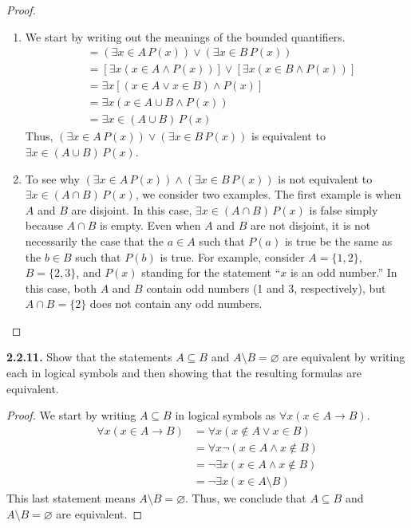 \documentclass[12pt]{amsart}
\newenvironment{statement}[1]{\smallskip\noindent\color[rgb]{.6627, .3529, .6314} {\bf #1.}}{}
\theoremstyle{definition}
\theoremstyle{remark}
\begin{document}
\begin{proof}
\hfill
\begin{enumerate}
	\item We start by writing out the meanings of the bounded quantifiers.
	\begin{align*}
		&= (\exists x \in A \, P(x)) \vee (\exists x \in B \, P(x)) \\
		&= [\exists x (x \in A \wedge P(x))] \vee [\exists x (x \in B \wedge P(x))] \\
		&= \exists x [(x \in A \vee x \in B) \wedge P(x)] \\
		&= \exists x (x \in A \cup B \wedge P(x)) \\
		&= \exists x \in (A \cup B) \, P(x)
	\end{align*}
	Thus, $(\exists x \in A \, P(x)) \vee (\exists x \in B \, P(x))$ is equivalent to
	$\exists x \in (A \cup B) \, P(x)$.
	
	\item To see why $(\exists x \in A \, P(x)) \wedge (\exists x \in B \, P(x))$ is not equivalent to
	$\exists x \in (A \cap B) \, P(x)$, we consider two examples.
	The first example is when $A$ and $B$ are disjoint.
	In this case, $\exists x \in (A \cap B) \, P(x)$ is false simply because $A \cap B$ is empty.
	Even when $A$ and $B$ are not disjoint, it is not necessarily the case that the $a \in A$
	such that $P(a)$ is true be the same as the $b \in B$ such that $P(b)$ is true.
	For example, consider $A = \{ 1, 2 \}$, $B = \{ 2, 3 \}$, and $P(x)$ standing for the statement
	``$x$ is an odd number.''
	In this case, both $A$ and $B$ contain odd numbers (1 and 3, respectively),
	but $A \cap B = \{ 2 \}$ does not contain any odd numbers.
\end{enumerate}
\end{proof}


\begin{statement}{2.2.11}
Show that the statements $A \subseteq B$ and $A \setminus B = \varnothing$ are equivalent by writing each in logical symbols and then showing that the resulting formulas are equivalent.
\end{statement}

\begin{proof}
We start by writing $A \subseteq B$ in logical symbols as $\forall x (x \in A \rightarrow B)$.
\begin{align*}
	\forall x (x \in A \rightarrow B)
	&= \forall x (x \notin A \vee x \in B) \\
	&= \forall x \neg (x \in A \wedge x \notin B) \\
	&= \neg \exists x (x \in A \wedge x \notin B) \\
	&= \neg \exists x (x \in  A \setminus B)
\end{align*}
This last statement means $A \setminus B = \varnothing$.
Thus, we conclude that $A \subseteq B$ and $A \setminus B = \varnothing$ are equivalent.
\end{proof}
\end{document}

